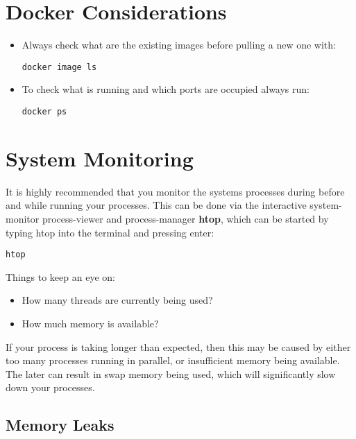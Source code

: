 \documentclass[
]{book}
\providecommand{\tightlist}{%
  \setlength{\itemsep}{0pt}\setlength{\parskip}{0pt}}
\begin{document}
\hypertarget{docker-considerations}{%
\section{Docker Considerations}\label{docker-considerations}}

\begin{itemize}
\item
  Always check what are the existing images before pulling a new one with:

\begin{verbatim}
docker image ls
\end{verbatim}
\item
  To check what is running and which ports are occupied always run:

\begin{verbatim}
docker ps 
\end{verbatim}
\end{itemize}

\hypertarget{system-monitoring}{%
\section{System Monitoring}\label{system-monitoring}}

It is highly recommended that you monitor the systems processes during before and while running your processes. This can be done via the interactive system-monitor process-viewer and process-manager \textbf{htop}, which can be started by typing htop into the terminal and pressing enter:

\begin{verbatim}
htop
\end{verbatim}

Things to keep an eye on:

\begin{itemize}
\tightlist
\item
  How many threads are currently being used?
\item
  How much memory is available?
\end{itemize}

If your process is taking longer than expected, then this may be caused by either too many processes running in parallel, or insufficient memory being available. The later can result in swap memory being used, which will significantly slow down your processes.

\hypertarget{memory-leaks}{%
\subsection{Memory Leaks}\label{memory-leaks}}
\end{document}
